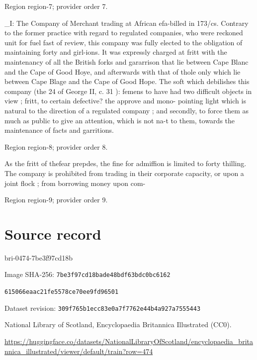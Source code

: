 \documentclass[11pt]{article}
\begin{document}
{\scriptsize\color{gray} Region region-7; provider order 7.\par}
\medskip

\_I: The Company of Merchant trading at African efa-billed in 173/cs. Contrary to the former practice with regard to regulated companies, who were reckoned unit for fuel fast of review, this company was fully elected to the obligation of maintaining forty and girl-ions. It was expressly charged at fritt with the maintenancy of all the British forks and gararrison that lie between Cape Blanc and the Cape of Good Hoye, and afterwards with that of thole only which lie between Cape Blage and the Cape of Good Hope. The soft which debilishes this company (the 24 of George II, c. 31 ): femens to have had two difficult objects in view ; fritt, to certain defective? the approve and mono- pointing light which is natural to the direction of a regulated company ; and secondly, to force them as much as public to give an attention, which is not na-t to them, towards the maintenance of facts and garritions.
\par

{\scriptsize\color{gray} Region region-8; provider order 8.\par}
\medskip

As the fritt of thefear prepdes, the fine for admiffion is limited to forty thilling. The company is prohibited from trading in their corporate capacity, or upon a joint flock ; from borrowing money upon com-
\par

{\scriptsize\color{gray} Region region-9; provider order 9.\par}
\medskip
\newpage\section*{Source record}
bri-0474-7be3f97cd18b\par
Image SHA-256: \texttt{7be3f97cd18bade48bdf63bdc0bc6162}\par\texttt{615066eaac21fe5578ce70ee9fd96501}\par
Dataset revision: \texttt{309f765b1ecc83e0a7f7}\texttt{762e44b4a927a7555443}\par
National Library of Scotland, Encyclopaedia Britannica Illustrated (CC0).\par
\url{https://huggingface.co/datasets/NationalLibraryOfScotland/encyclopaedia_britannica_illustrated/viewer/default/train?row=474}
\end{document}
